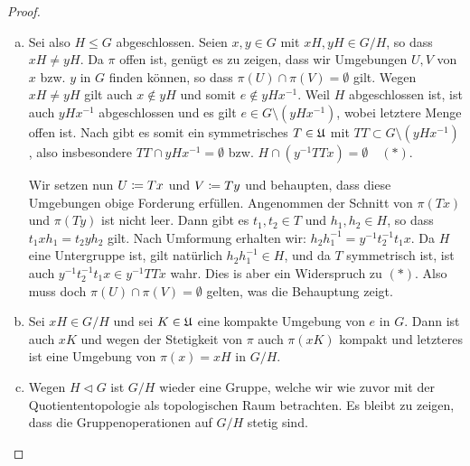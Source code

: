 \begin{proof}\hfill
    \begin{enumerate}[(a)]
        \item
            Sei also $H\leq G$ abgeschlossen. Seien $x,y\in G$ mit 
            $xH, yH\in G/H$, so dass $xH\neq yH$. Da $\pi$ offen ist,
            genügt es zu zeigen, dass
            wir Umgebungen $U,V$ von $x$ bzw. $y$ in $G$ finden können, so dass
            $\pi(U)\cap\pi(V)=\emptyset$ gilt. Wegen $xH\neq yH$ gilt auch
            $x\notin yH$ und somit $e\notin yHx^{-1}$. Weil $H$ abgeschlossen
            ist, ist auch $yHx^{-1}$ abgeschlossen und es gilt 
            $e\in G\setminus (yHx^{-1})$, wobei letztere Menge offen ist. Nach
             gibt es somit ein symmetrisches
            $T\in\mathfrak{U}$ mit $TT \subset G\setminus (yHx^{-1})$, also
            insbesondere $TT \cap yHx^{-1} = \emptyset$ bzw.
            $H \cap (y^{-1} TT x) = \emptyset$~~$(\ast)$.
            
            Wir setzen nun $U \coloneqq Tx$ und $V\coloneqq Ty$ und behaupten, dass
            diese Umgebungen obige Forderung erfüllen. Angenommen der Schnitt
            von $\pi(Tx)$ und $\pi(Ty)$ ist nicht leer. Dann gibt es 
            $t_1,t_2\in T$ und $h_1,h_2\in H$, so dass $t_1xh_1 = t_2yh_2$ gilt.
            Nach Umformung erhalten wir: $h_2h_1^{-1} = y^{-1}t_2^{-1} t_1 x$.
            Da $H$ eine Untergruppe ist, gilt natürlich $h_2h_1^{-1} \in H$, und
            da $T$ symmetrisch ist, ist auch
            $y^{-1}t_2^{-1} t_1 x \in y^{-1}TTx$ wahr. Dies is aber ein
            Widerspruch zu $(\ast)$. Also muss doch $\pi(U)\cap\pi(V)=\emptyset$
            gelten, was die Behauptung zeigt.
            
        \item
            Sei $xH\in G/H$ und sei $K\in\mathfrak{U}$ eine kompakte Umgebung von $e$
            in $G$. Dann ist auch $xK$ und wegen der Stetigkeit von $\pi$ auch
            $\pi(xK)$ kompakt und letzteres ist eine Umgebung von $\pi(x)=xH$ in
            $G/H$.
            
        \item
            Wegen $H\triangleleft G$ ist $G/H$ wieder eine Gruppe, welche wir
            wie zuvor mit der Quotiententopologie als topologischen Raum
            betrachten. Es bleibt zu zeigen, dass die Gruppenoperationen auf
            $G/H$ stetig sind.
            

\end{enumerate}
\end{proof}
